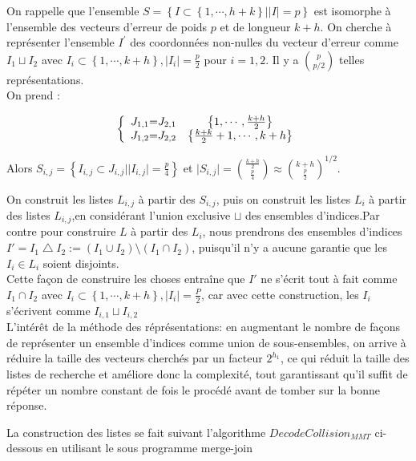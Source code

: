 \documentclass[12pt,openany]{report}
\begin{document}
On rappelle que l'ensemble $ \mathit{S}= \left\lbrace I \subset \left\lbrace  1,\cdots,h+k \right\rbrace  | \mid I \mid =p  \right\rbrace  $ est isomorphe à
l’ensemble des vecteurs d’erreur de poids $p$ et de longueur $k + h$. On cherche à
représenter l’ensemble $  \mathit{I}^{'} $ des coordonnées non-nulles du vecteur d’erreur comme $ I_1 \sqcup I_2 $ avec $ I_i \subset \left\lbrace 1,\cdots, k+h\right\rbrace , \mid I_i \mid =\frac{p}{2} $ pour $ i=1,2 $. Il y a $ p\choose {p/2}   $ telles représentations.\\
On prend :

\[
\left \{
\begin{array}{ c @{=} c c}
   J_{1,1} & J_{2,1} & \left\lbrace 1,\cdots,\frac{k+h}{2} \right\rbrace \\
   J_{1,2} & J_{2,2} & \left\lbrace  \frac{k+k}{2}+1,\cdots,k+h \right\rbrace 
   
\end{array}
\right.
\]

Alors $ S_{i,j}=\left\lbrace I_{i,j} \subset J_{i,j} | \mid I_{i,j}\mid =\frac{p}{4}  \right\rbrace     $ et $ \mid S_{i,j} \mid={{\frac{k+h}{2}}\choose {\frac{p}{4}}} \approx {{k+h}\choose {\frac{p}{2}}}^{1/2} $.

On construit les listes $ L_{i,j} $ à partir des $ S_{i,j} $, puis on construit les listes $ L_i $ à partir des listes $L_{i,j}  $,en considérant l'union exclusive $  \sqcup $ des ensembles d'indices.Par contre pour construire $L$ à partir des $L_{i}$, nous prendrons des ensembles d'indices $ I'=I_1 \bigtriangleup I_2     := (I_1\cup I_2)\setminus (I_1 \cap I_2)$, puisqu'il n'y a aucune garantie que les $ I_i \in L_i  $ soient disjoints.\\ 
Cette façon de construire les choses entraîne que $\mathit{I'}$ ne s'écrit tout à fait comme $ I_1 \cap I_2  $ avec $ I_i \subset \left\lbrace 1,\cdots,k+h \right\rbrace , \mid I_i \mid =\frac{P}{2}$, car avec cette construction, les $I_i  $ s'écrivent comme $I_{i,1}\sqcup I_{i,2}  $\\
L'intérêt de la méthode des réprésentations: en augmentant le nombre de façons de représenter un ensemble d'indices comme union de sous-ensembles, on arrive à réduire la taille des vecteurs cherchés par un facteur $ 2^{h_1}  $, ce qui réduit la taille
des listes de recherche et améliore donc la complexité, tout garantissant qu’il suffit de répéter un nombre constant de fois le procédé avant de tomber sur la bonne réponse.

La construction des listes se fait suivant l'algorithme $DecodeCollision_{MMT}$ ci-dessous en utilisant le sous programme merge-join
\end{document}
